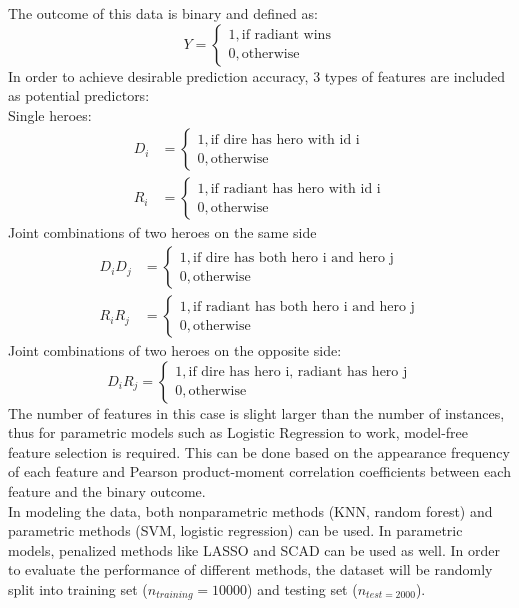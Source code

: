 \documentclass[landscape,a0paper,fontscale=0.285]{baposter} %
\begin{document}
\begin{poster}
{\begin{multicols}{2}
	The outcome of this data is binary and defined as:
	\begin{displaymath}
	Y = \left\{
	\begin{array}{lr}
	1, \text{if radiant wins}\\
	0, \text{otherwise}
	\end{array}
	\right.
	\end{displaymath}
	In order to achieve desirable prediction accuracy, 3 types of features are included as potential predictors:\\ 
	Single heroes:
	\begin{align*}
	D_i &= \left\{
	\begin{array}{lr}
	1, \text{if dire has hero with id i}\\
	0, \text{otherwise}
	\end{array}
	\right.\\
		R_i &= \left\{
		\begin{array}{lr}
			1, \text{if radiant has hero with id i}\\
			0, \text{otherwise}
		\end{array}
		\right.
		\end{align*} 
	Joint combinations of two heroes on the same side	
	\begin{align*}
	D_iD_j &= \left\{
	\begin{array}{lr}
	1, \text{if dire has both hero i and hero j}\\
	0, \text{otherwise}
	\end{array}
	\right.\\
		R_iR_j &= \left\{
		\begin{array}{lr}
		1, \text{if radiant has both hero i and hero j}\\
		0, \text{otherwise}
		\end{array}
		\right.
		\end{align*} 
	Joint combinations of two heroes on the opposite side:	
	\begin{displaymath}
	D_iR_j = \left\{
	\begin{array}{lr}
	1, \text{if dire has hero i, radiant has hero j}\\
	0, \text{otherwise}
	\end{array}
	\right.
	\end{displaymath} 		
	The number of features in this case is slight larger than the number of instances, thus for parametric models such as Logistic Regression to work, model-free feature selection is required. This can be done based on the appearance frequency of each feature and Pearson product-moment correlation coefficients between each feature and the binary outcome. \\
	In modeling the data, both nonparametric methods (KNN, random forest) and parametric methods (SVM, logistic regression) can be used. In parametric models, penalized methods like LASSO and SCAD can be used as well. In order to evaluate the performance of different methods, the dataset will be randomly split into training set ($n_{training} = 10000$) and testing set ($n_{test = 2000}$). \\
\end{multicols}

}
\end{poster}
\end{document}
